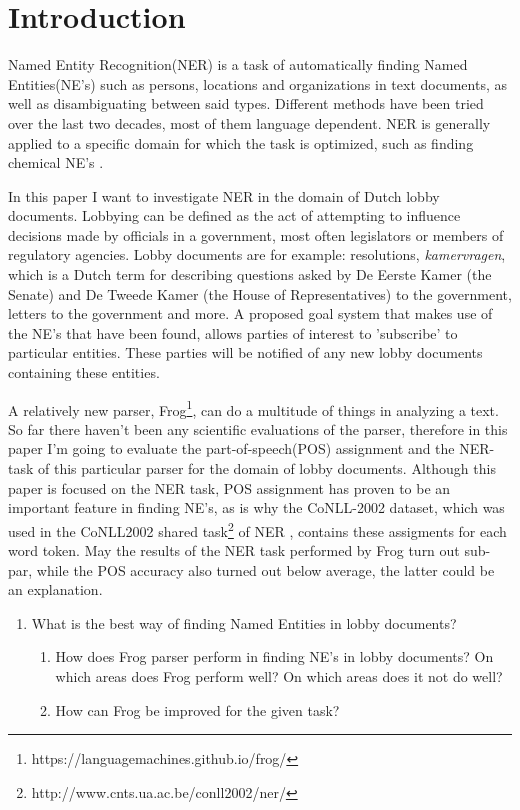 \section{Introduction} \label{sec:introduction}
Named Entity Recognition(NER) is a task of automatically finding Named Entities(NE's) such as persons, locations and organizations in text documents, as well as disambiguating between said types. Different methods have been tried over the last two decades, most of them language dependent. NER is generally applied to a specific domain for which the task is optimized, such as finding chemical NE's \cite{rocktaschel2012chemspot}. 

In this paper I want to investigate NER in the domain of Dutch lobby documents. Lobbying can be defined as the act of attempting to influence decisions made by officials in a government, most often legislators or members of regulatory agencies. Lobby documents are for example: resolutions, \textit{kamervragen}, which is a Dutch term for describing questions asked by De Eerste Kamer (the Senate) and De Tweede Kamer (the House of Representatives) to the government, letters to the government and more. A proposed goal system that makes use of the NE's that have been found, allows parties of interest to 'subscribe' to particular entities. These parties will be notified of any new lobby documents containing these entities. 

A relatively new parser, Frog\footnote{https://languagemachines.github.io/frog/}, can do a multitude of things in analyzing a text. So far there haven't been any scientific evaluations of the parser, therefore in this paper I'm going to evaluate the part-of-speech(POS) assignment and the NER-task of this particular parser for the domain of lobby documents. Although this paper is focused on the NER task, POS assignment has proven to be an important feature in finding NE's, as is why the CoNLL-2002 dataset, which was used in the CoNLL2002 shared task\footnote{http://www.cnts.ua.ac.be/conll2002/ner/} of NER , contains these assigments for each word token. May the results of the NER task performed by Frog turn out sub-par, while the POS accuracy also turned out below average, the latter could be an explanation.

\begin{enumerate}
    \item What is the best way of finding Named Entities in lobby documents?
    \begin{enumerate}
        \item   How does Frog parser perform in finding NE's in lobby documents?  On which areas does Frog perform well? On which areas does it not do well?
        \item How can Frog be improved for the given task?
    \end{enumerate}
\end{enumerate}


